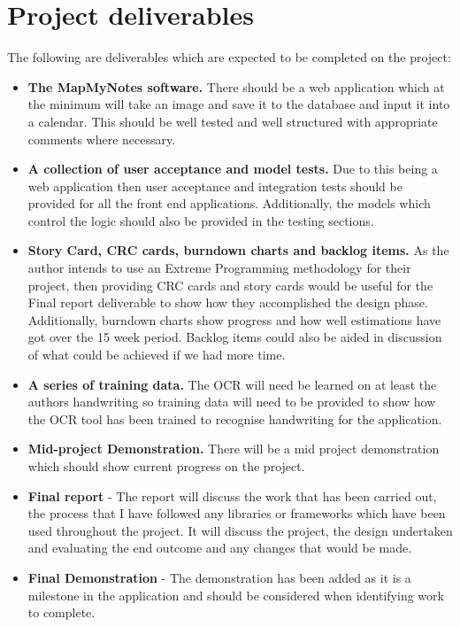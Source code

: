 \documentclass[11pt,fleqn,twoside]{article}
\begin{document}
\section{Project deliverables}
The following are deliverables which are expected to be completed on the project:
\begin{itemize}

  \item \textbf{The MapMyNotes software.} There should be a web application which at the minimum will take an image and save it to the database and input it into a calendar. This should be well tested and well structured with appropriate comments where necessary.

  \item \textbf{A collection of user acceptance and model tests.} Due to this being a web application then user acceptance and integration tests should be provided for all the front end applications. Additionally, the models which control the logic should also be provided in the testing sections.

  \item \textbf{Story Card, CRC cards, burndown charts and backlog items.} As the author intends to use an Extreme Programming methodology for their project, then providing CRC cards and story cards would be useful for the Final report deliverable to show how they accomplished the design phase. Additionally, burndown charts show progress and how well estimations have got over the 15 week period. Backlog items could also be aided in discussion of what could be achieved if we had more time.

  \item \textbf{A series of training data.} The OCR will need be learned on at least the authors handwriting so training data will need to be provided to show how the OCR tool has been trained to recognise handwriting for the application.

  \item \textbf{Mid-project Demonstration.} There will be a mid project demonstration which should show current progress on the project.

  \item \textbf{Final report} - The report will discuss the work that has been carried out, the process that I have followed any libraries or frameworks which have been used throughout the project. It will discuss the project, the design undertaken and evaluating the end outcome and any changes that would be made.

  \item \textbf{Final Demonstration} - The demonstration has been added as it is a milestone in the application and should be considered when identifying work to complete.

\end{itemize}
\end{document}
